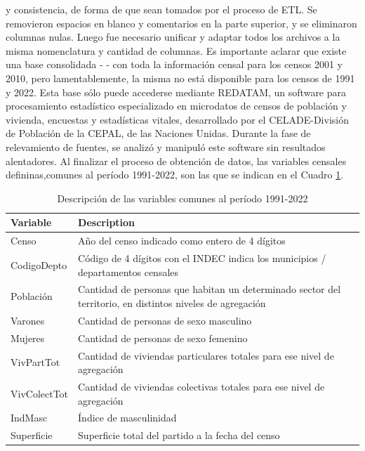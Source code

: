 \documentclass{article}
\theoremstyle{mytheoremstyle}
\theoremstyle{mytheoremstyle}
\theoremstyle{myproblemstyle}
\begin{document}
y consistencia, de forma de que sean tomados por el proceso de ETL. Se removieron espacios en blanco y comentarios
en la parte superior, y se eliminaron columnas nulas. Luego fue necesario unificar y adaptar todos los archivos a la 
misma nomenclatura y  cantidad de columnas.\newline\newline
Es importante aclarar que existe una base consolidada - -  con toda la información censal para los censos 2001 y 2010, 
pero lamentablemente, la misma no está disponible para los censos de 1991 y 2022. Esta base sólo puede accederse mediante REDATAM, 
un software para procesamiento estadístico especializado en microdatos de  censos de población y vivienda, encuestas y estadísticas vitales, desarrollado por el CELADE-División de Población de la CEPAL, 
de las Naciones Unidas. Durante la fase de relevamiento de fuentes, se analizó y manipuló este software sin resultados alentadores.\newline\newline
Al finalizar el proceso de obtención de datos, las variables censales defininas,comunes al período 1991-2022, son las que se indican en el Cuadro \ref{variables}.
 \begin{table}[htbp]
     \centering
       \begin{tabular}{|l|p{8cm}|}
         \hline
         \textbf{Variable} & \textbf{Description} \\
         \hline
         Censo & Año del censo indicado como entero de 4 dígitos \\
         CodigoDepto & Código de 4 dígitos con el INDEC indica los municipios / departamentos censales \\
         Población & Cantidad de personas que habitan un determinado sector del territorio, en distintos niveles de agregación\\
         Varones & Cantidad de personas de sexo masculino \\
         Mujeres & Cantidad de personas de sexo femenino \\
         VivPartTot & Cantidad de viviendas particulares totales para ese nivel de agregación \\
         VivColectTot & Cantidad de viviendas colectivas totales para ese nivel de agregación \\
         IndMasc & Índice de masculinidad \\
         Superficie & Superficie total del partido a la fecha del censo \\
         \hline
     \end{tabular}
 \caption{Descripción de las variables comunes al período 1991-2022}
     \label{variables}
 \end{table}
\end{document}
